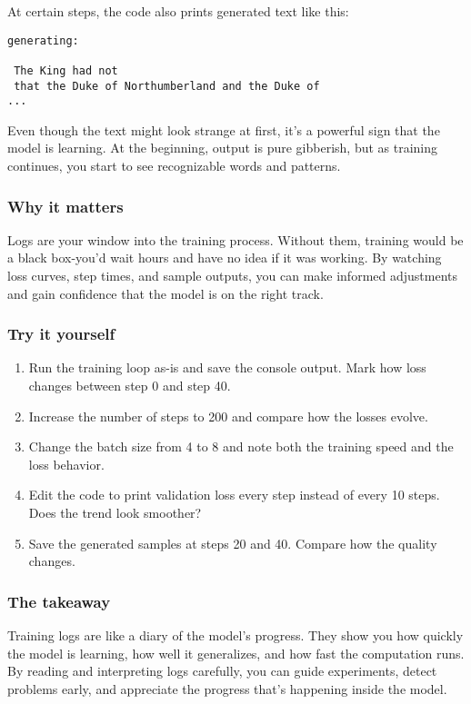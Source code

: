 \documentclass[
  letterpaper,
  DIV=11,
  numbers=noendperiod]{scrreprt}
\providecommand{\tightlist}{%
  \setlength{\itemsep}{0pt}\setlength{\parskip}{0pt}}
\begin{document}
At certain steps, the code also prints generated text like this:

\begin{verbatim}
generating:

 The King had not
 that the Duke of Northumberland and the Duke of
...
\end{verbatim}

Even though the text might look strange at first, it's a powerful sign
that the model is learning. At the beginning, output is pure gibberish,
but as training continues, you start to see recognizable words and
patterns.

\subsubsection{Why it matters}\label{why-it-matters-30}

Logs are your window into the training process. Without them, training
would be a black box-you'd wait hours and have no idea if it was
working. By watching loss curves, step times, and sample outputs, you
can make informed adjustments and gain confidence that the model is on
the right track.

\subsubsection{Try it yourself}\label{try-it-yourself-38}

\begin{enumerate}
\def\labelenumi{\arabic{enumi}.}
\tightlist
\item
  Run the training loop as-is and save the console output. Mark how loss
  changes between step 0 and step 40.
\item
  Increase the number of steps to 200 and compare how the losses evolve.
\item
  Change the batch size from 4 to 8 and note both the training speed and
  the loss behavior.
\item
  Edit the code to print validation loss every step instead of every 10
  steps. Does the trend look smoother?
\item
  Save the generated samples at steps 20 and 40. Compare how the quality
  changes.
\end{enumerate}

\subsubsection{The takeaway}\label{the-takeaway-39}

Training logs are like a diary of the model's progress. They show you
how quickly the model is learning, how well it generalizes, and how fast
the computation runs. By reading and interpreting logs carefully, you
can guide experiments, detect problems early, and appreciate the
progress that's happening inside the model.
\end{document}
